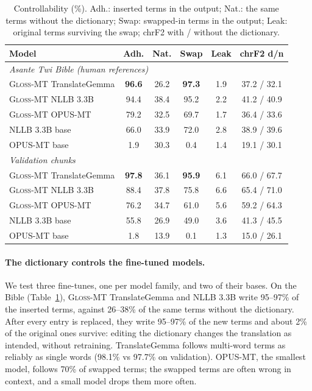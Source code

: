 \documentclass[10pt,twocolumn]{article}
\newcommand{\gm}{\textsc{Gloss-MT}}
\begin{document}
\begin{table}[t]
\centering
\footnotesize
\setlength{\tabcolsep}{3pt}
\begin{tabular}{lccccc}
\toprule
Model & Adh. & Nat. & Swap & Leak & chrF2 d/n \\
\midrule
\multicolumn{6}{l}{\emph{Asante Twi Bible (human references)}} \\
\gm{} TranslateGemma & \textbf{96.6} & 26.2 & \textbf{97.3} & 1.9 & 37.2 / 32.1 \\
\gm{} NLLB 3.3B & 94.4 & 38.4 & 95.2 & 2.2 & 41.2 / 40.9 \\
\gm{} OPUS-MT & 79.2 & 32.5 & 69.7 & 1.7 & 36.4 / 33.6 \\
NLLB 3.3B base & 66.0 & 33.9 & 72.0 & 2.8 & 38.9 / 39.6 \\
OPUS-MT base & 1.9 & 30.3 & 0.4 & 1.4 & 19.1 / 30.1 \\
\midrule
\multicolumn{6}{l}{\emph{Validation chunks}} \\
\gm{} TranslateGemma & \textbf{97.8} & 36.1 & \textbf{95.9} & 6.1 & 66.0 / 67.7 \\
\gm{} NLLB 3.3B & 88.4 & 37.8 & 75.8 & 6.6 & 65.4 / 71.0 \\
\gm{} OPUS-MT & 76.2 & 34.7 & 61.0 & 5.6 & 59.2 / 64.3 \\
NLLB 3.3B base & 55.8 & 26.9 & 49.0 & 3.6 & 41.3 / 45.5 \\
OPUS-MT base & 1.8 & 13.9 & 0.1 & 1.3 & 15.0 / 26.1 \\
\bottomrule
\end{tabular}
\caption{Controllability (\%). Adh.: inserted terms in the output; Nat.: the same terms without the dictionary; Swap: swapped-in terms in the output; Leak: original terms surviving the swap; chrF2 with / without the dictionary.}
\label{tab:ctrl}
\end{table}

\paragraph{The dictionary controls the fine-tuned models.} We test three fine-tunes, one per model family, and two of their bases. On the Bible (Table~\ref{tab:ctrl}), \gm{} TranslateGemma and NLLB 3.3B write 95--97\% of the inserted terms, against 26--38\% of the same terms without the dictionary. After every entry is replaced, they write 95--97\% of the new terms and about 2\% of the original ones survive: editing the dictionary changes the translation as intended, without retraining. TranslateGemma follows multi-word terms as reliably as single words (98.1\% vs 97.7\% on validation). OPUS-MT, the smallest model, follows 70\% of swapped terms; the swapped terms are often wrong in context, and a small model drops them more often.
\end{document}
